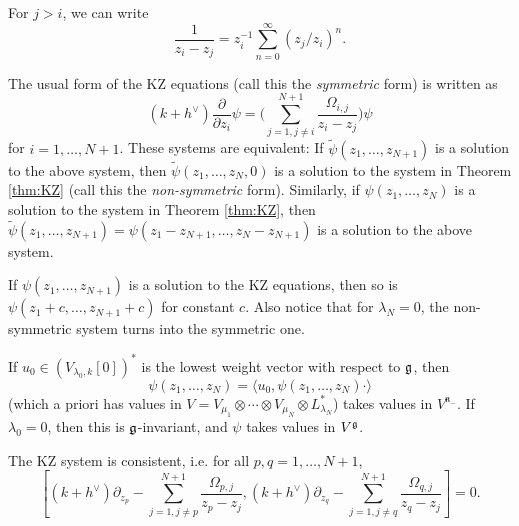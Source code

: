\begin{remark}
  For $j > i$, we can write
  \[
    \frac{1}{z_i - z_j}
    = z_i^{-1} \sum_{n = 0}^\infty (z_j / z_i)^n.
  \]
\end{remark}

\begin{remark}
  The usual form of the KZ equations (call
  this the \emph{symmetric} form) is
  written as
  \[
    (k + h^\vee) \frac{\partial}{\partial z_i} \psi
    = \bigg(
      \sum_{j = 1, j \ne i}^{N + 1}
      \frac{\Omega_{i, j}}{z_i - z_j}
    \bigg) \psi
  \]
  for $i = 1, \dots, N + 1$. These
  systems are
  equivalent: If $\widetilde{\psi}(z_1, \dots, z_{N + 1})$
  is a solution to the above system, then
  $\widetilde{\psi}(z_1, \dots, z_N, 0)$ is a solution to the system in Theorem
  \ref{thm:KZ} (call this the
  \emph{non-symmetric} form). Similarly, if
  $\psi(z_1, \dots, z_N)$ is a solution to the system in Theorem \ref{thm:KZ}, then
  $\widetilde{\psi}(z_1, \dots, z_{N + 1}) = \psi(z_1 - z_{N + 1}, \dots, z_N - z_{N + 1})$ is a solution to the above system.
\end{remark}

\begin{remark}
  If $\psi(z_1, \dots, z_{N + 1})$ is a solution
  to the KZ equations, then so is
  $\psi(z_1 + c, \dots, z_{N + 1} + c)$
  for constant $c$. Also notice that
  for $\lambda_N = 0$, the non-symmetric
  system turns into the symmetric one.
\end{remark}

\begin{remark}
  If $u_0 \in (V_{\lambda_0, k}[0])^*$
  is the lowest weight vector with respect
  to $\mathfrak{g}$, then
  \[
    \psi(z_1, \dots, z_N)
    = \langle u_0, \psi(z_1, \dots, z_N) \cdot \rangle
  \]
  (which a priori has values in $V = V_{\mu_1} \otimes \cdots \otimes V_{\mu_N} \otimes L_{\lambda_N}^*$)
  takes values in $V^{\mathfrak{n}_-}$.
  If $\lambda_0 = 0$, then
  this is $\mathfrak{g}$-invariant, and $\psi$ takes
  values in $V^{\mathfrak{g}}$.
\end{remark}

\begin{theorem}
  The KZ system is consistent, i.e.
  for all $p, q = 1, \dots, N + 1$,
  \[
    \left[
      (k + h^\vee) \partial_{z_p}
      - \sum_{j = 1, j \ne p}^{N + 1}
      \frac{\Omega_{p, j}}{z_p - z_j},
      (k + h^\vee) \partial_{z_q}
      - \sum_{j = 1, j \ne q}^{N + 1}
      \frac{\Omega_{q, j}}{z_q - z_j}
    \right] = 0.
  \]
\end{theorem}

